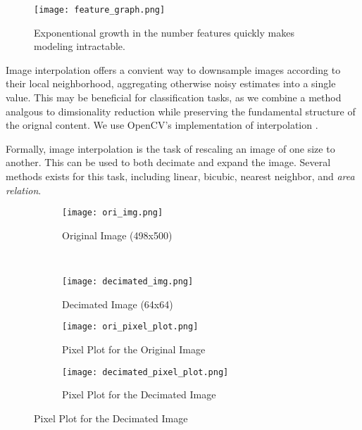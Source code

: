 \documentclass{article}
\begin{document}
\begin{figure}
  \centering
  \texttt{[image: feature\_graph.png]}
  \vspace{-5pt}
  \caption{Exponentional growth in the number features quickly makes modeling intractable.}
  \label{fig:feature-size}
\end{figure}

Image interpolation offers a convient way to downsample images according to
their local neighborhood, aggregating otherwise noisy estimates into a single
value. This may be beneficial for classification tasks, as we combine a method
analgous to dimsionality reduction while preserving the fundamental structure of
the orignal content. We use OpenCV's implementation of interpolation \cite{opencv}.

Formally, image interpolation is the task of rescaling an image of one size
to another. This can be used to both decimate and expand the image. Several
methods exists for this task, including linear, bicubic, nearest neighbor, and
\textit{area relation}.

\begin{figure}
  \centering
  \caption{Results of Interpolating a 249,000 pixel image to a 4,096 pixel image.}
  \label{fig:interpolation}
  \begin{subfigure}[b]{0.45\textwidth}
    \centering
    \texttt{[image: ori\_img.png]}
    \vspace{-13pt}
    \caption{Original Image (498x500)}
    \label{fig:ori-image}
  \end{subfigure}
  ~
  \begin{subfigure}[b]{0.45\textwidth}
    \centering
    \texttt{[image: decimated\_img.png]}
    \vspace{-13pt}
    \caption{Decimated Image (64x64)}
    \label{fig:reduced-img}
  \end{subfigure}

  \begin{subfigure}[b]{1.\textwidth}
    \centering
    \texttt{[image: ori\_pixel\_plot.png]}
    \caption{Pixel Plot for the Original Image}
    \label{fig:ori-pixel-plot}
  \end{subfigure}

  \begin{subfigure}[b]{1.\textwidth}
    \centering
    \texttt{[image: decimated\_pixel\_plot.png]}
    \caption{Pixel Plot for the Decimated Image}
    \label{fig:reduced-pixel-plot}
  \end{subfigure}
\end{figure}
\end{document}
